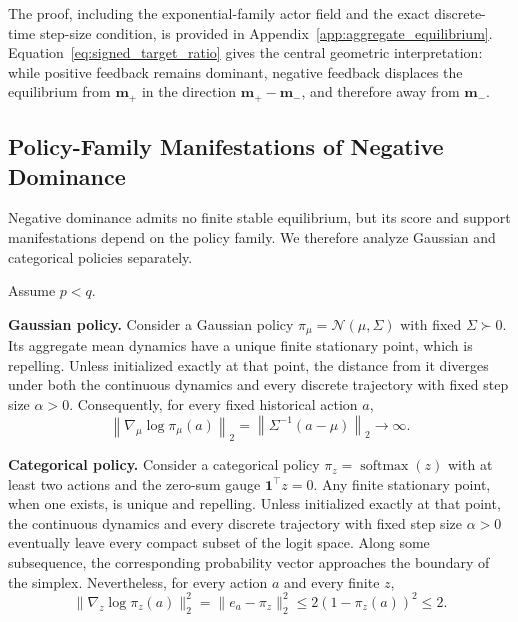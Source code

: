 \documentclass[sigconf,anonymous,review]{acmart}
\theoremstyle{acmdefinition}
\begin{document}
The proof, including the exponential-family actor field and the exact
discrete-time step-size condition, is provided in
Appendix~\ref{app:aggregate_equilibrium}.
Equation~\eqref{eq:signed_target_ratio} gives the central geometric
interpretation: while positive feedback remains dominant, negative
feedback displaces the equilibrium from \(\mathbf m_+\) in the direction
\(\mathbf m_+-\mathbf m_-\), and therefore away from
\(\mathbf m_-\).

\subsection{Policy-Family Manifestations of Negative Dominance}
\label{sec:policy_family_manifestations}

Negative dominance admits no finite stable equilibrium, but its score
and support manifestations depend on the policy family. We therefore
analyze Gaussian and categorical policies separately.

\begin{theorem}
\label{thm:policy_family_manifestations}
Assume \(p<q\).

\textbf{Gaussian policy.}
Consider a Gaussian policy
\(\pi_\mu=\mathcal N(\mu,\Sigma)\) with fixed
\(\Sigma\succ0\). Its aggregate mean dynamics have a unique finite
stationary point, which is repelling. Unless initialized exactly at that
point, the distance from it diverges under both the continuous dynamics
and every discrete trajectory with fixed step size \(\alpha>0\).
Consequently, for every fixed historical action \(a\),
\begin{equation}
    \left\|
        \nabla_\mu\log\pi_\mu(a)
    \right\|_2
    =
    \left\|
        \Sigma^{-1}(a-\mu)
    \right\|_2
    \longrightarrow
    \infty.
    \label{eq:gaussian_unbounded_score}
\end{equation}

\textbf{Categorical policy.}
Consider a categorical policy
\(\pi_z=\operatorname{softmax}(z)\) with at least two actions and the
zero-sum gauge \(\mathbf 1^\top z=0\). Any finite stationary point, when
one exists, is unique and repelling. Unless initialized exactly at that
point, the continuous dynamics and every discrete trajectory with fixed
step size \(\alpha>0\) eventually leave every compact subset of the
logit space. Along some subsequence, the corresponding probability
vector approaches the boundary of the simplex. Nevertheless, for every
action \(a\) and every finite \(z\),
\begin{equation}
\|\nabla_z\log\pi_z(a)\|_2^2
=
\|e_a-\pi_z\|_2^2
\le 2(1-\pi_z(a))^2
\le 2.
\label{eq:categorical_bounded_score}
\end{equation}
\end{theorem}
\end{document}

